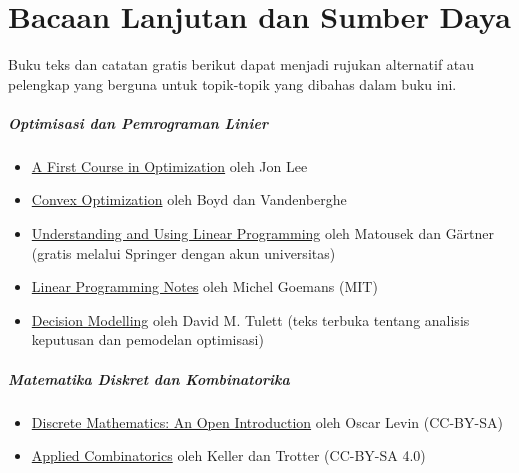 
\chapter{Bacaan Lanjutan dan Sumber Daya}

Buku teks dan catatan gratis berikut dapat menjadi rujukan alternatif atau pelengkap yang berguna untuk topik-topik yang dibahas dalam buku ini.

\paragraph{\textbf{Optimisasi dan Pemrograman Linier}}
\begin{itemize}
\item \href{http://www.optimization-online.org/DB_FILE/2013/12/4161.pdf}{A First Course in Optimization} oleh Jon Lee
\item \href{https://web.stanford.edu/~boyd/cvxbook/}{Convex Optimization} oleh Boyd dan Vandenberghe
\item \href{https://www.springer.com/gp/book/9783540306979}{Understanding and Using Linear Programming} oleh Matousek dan G\"artner (gratis melalui Springer dengan akun universitas)
\item \href{http://math.mit.edu/~goemans/18310S15/lpnotes310.pdf}{Linear Programming Notes} oleh Michel Goemans (MIT)
\item \href{https://www.researchgate.net/publication/411022416_Decision_Modelling}{Decision Modelling} oleh David M. Tulett (teks terbuka tentang analisis keputusan dan pemodelan optimisasi)
\end{itemize}

\paragraph{\textbf{Matematika Diskret dan Kombinatorika}}
\begin{itemize}
\item \href{http://discrete.openmathbooks.org/dmoi3.html}{Discrete Mathematics: An Open Introduction} oleh Oscar Levin (CC-BY-SA)
\item \href{http://www.rellek.net/book/frontmatter-1.html}{Applied Combinatorics} oleh Keller dan Trotter (CC-BY-SA 4.0)
\end{itemize}

